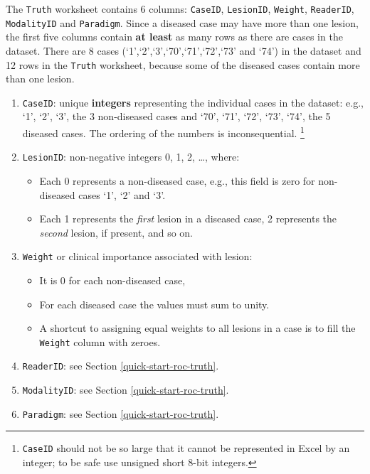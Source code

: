 \documentclass[
]{book}
\providecommand{\tightlist}{%
  \setlength{\itemsep}{0pt}\setlength{\parskip}{0pt}}
\begin{document}
The \texttt{Truth} worksheet contains 6 columns: \texttt{CaseID}, \texttt{LesionID}, \texttt{Weight}, \texttt{ReaderID}, \texttt{ModalityID} and \texttt{Paradigm}. Since a diseased case may have more than one lesion, the first five columns contain \textbf{at least} as many rows as there are cases in the dataset. There are 8 cases (`1',`2',`3',`70',`71',`72',`73' and `74') in the dataset and 12 rows in the \texttt{Truth} worksheet, because some of the diseased cases contain more than one lesion.

\begin{enumerate}
\def\labelenumi{\arabic{enumi}.}
\item
  \texttt{CaseID}: unique \textbf{integers} representing the individual cases in the dataset: e.g., `1', `2', `3', the 3 non-diseased cases and `70', `71', `72', `73', `74', the 5 diseased cases. The ordering of the numbers is inconsequential. \footnote{\texttt{CaseID} should not be so large that it cannot be represented in Excel by an integer; to be safe use unsigned short 8-bit integers.}
\item
  \texttt{LesionID}: non-negative integers 0, 1, 2, \ldots, where:

  \begin{itemize}
  \tightlist
  \item
    Each 0 represents a non-diseased case, e.g., this field is zero for non-diseased cases `1', `2' and `3'.
  \item
    Each 1 represents the \emph{first} lesion in a diseased case, 2 represents the \emph{second} lesion, if present, and so on.
  \end{itemize}
\item
  \texttt{Weight} or clinical importance associated with lesion:

  \begin{itemize}
  \tightlist
  \item
    It is 0 for each non-diseased case,
  \item
    For each diseased case the values must sum to unity.
  \item
    A shortcut to assigning equal weights to all lesions in a case is to fill the \texttt{Weight} column with zeroes.
  \end{itemize}
\item
  \texttt{ReaderID}: see Section \ref{quick-start-roc-truth}.
\item
  \texttt{ModalityID}: see Section \ref{quick-start-roc-truth}.
\item
  \texttt{Paradigm}: see Section \ref{quick-start-roc-truth}.
\end{enumerate}
\end{document}

